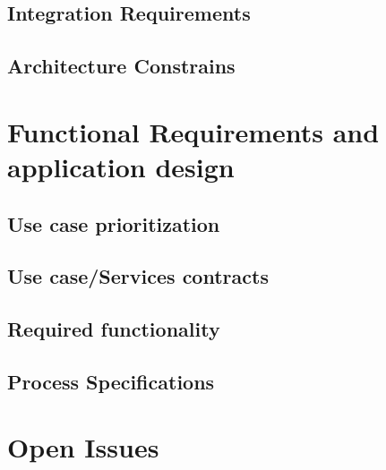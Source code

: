 \documentclass[10pt,a4paper]{exam}
\begin{document}
\subsection{Integration Requirements}
\lipsum[4]
\subsection{Architecture Constrains}
\lipsum[5]

\section{Functional Requirements and application design}
\subsection{Use case prioritization}
\lipsum[6]
\subsection{Use case/Services contracts}
\lipsum[7]
\subsection{Required functionality}
\lipsum[8]
\subsection{Process Specifications}
\lipsum[9]

\section{Open Issues}
\lipsum[10]
%
%
\end{document}
